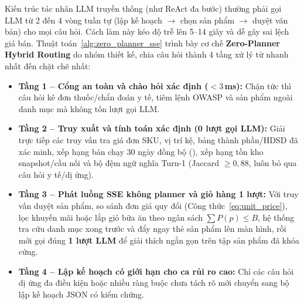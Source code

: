 Kiến trúc tác nhân LLM truyền thống (như ReAct đa bước) thường phải gọi LLM từ 2 đến 4 vòng tuần tự (lập kế hoạch $\to$ chọn sản phẩm $\to$ duyệt văn bản) cho mọi câu hỏi. Cách làm này kéo độ trễ lên 5--14 giây và dễ gây sai lệch giá bán. Thuật toán~\ref{alg:zero_planner_sse} trình bày cơ chế \textbf{Zero-Planner Hybrid Routing} do nhóm thiết kế, chia câu hỏi thành 4 tầng xử lý từ nhanh nhất đến chặt chẽ nhất:
\begin{itemize}
    \item \textbf{Tầng 1 -- Cổng an toàn và chào hỏi xác định ($<3$\,ms):} Chặn tức thì câu hỏi kê đơn thuốc/chẩn đoán y tế, tiêm lệnh OWASP và sản phẩm ngoài danh mục mà không tốn lượt gọi LLM.
    \item \textbf{Tầng 2 -- Truy xuất và tính toán xác định (0 lượt gọi LLM):} Giải trực tiếp các truy vấn tra giá đơn SKU, vị trí kệ, bảng thành phần/HDSD đã xác minh, xếp hạng bán chạy 30 ngày đồng bộ (), xếp hạng tồn kho snapshot/cầu nối và bộ đệm ngữ nghĩa Turn-1 (Jaccard $\ge 0{,}88$, luôn bỏ qua câu hỏi y tế/dị ứng).
    \item \textbf{Tầng 3 -- Phát luồng SSE không planner và giỏ hàng 1 lượt:} Với truy vấn duyệt sản phẩm, so sánh đơn giá quy đổi (Công thức~\ref{eq:unit_price}), lọc khuyến mãi hoặc lắp giỏ bữa ăn theo ngân sách $\sum P(p) \le B$, hệ thống tra cứu danh mục xong trước và đẩy ngay thẻ sản phẩm lên màn hình, rồi mới gọi đúng \textbf{1 lượt LLM} để giải thích ngắn gọn trên tập sản phẩm đã khóa cứng.
    \item \textbf{Tầng 4 -- Lập kế hoạch có giới hạn cho ca rủi ro cao:} Chỉ các câu hỏi dị ứng đa điều kiện hoặc nhiều ràng buộc chưa tách rõ mới chuyển sang bộ lập kế hoạch JSON có kiểm chứng.
\end{itemize}


